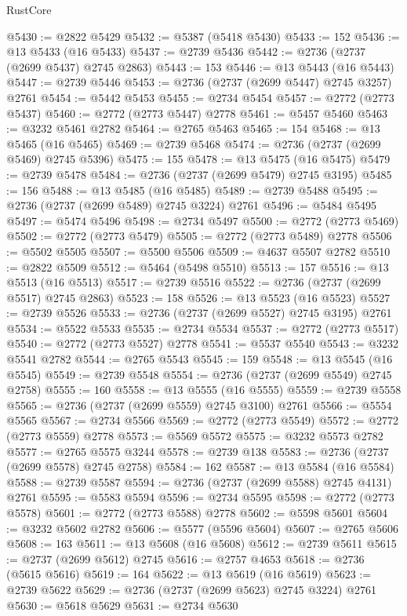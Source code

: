 \begin{lexlean}{RustCore}
\begin{coremodule}
@5430 := @2822 @5429
@5432 := @5387 (@5418 @5430)
@5433 := 152
@5436 := @13 @5433 (@16 @5433)
@5437 := @2739 @5436
@5442 := @2736 (@2737 (@2699 @5437) @2745 @2863)
@5443 := 153
@5446 := @13 @5443 (@16 @5443)
@5447 := @2739 @5446
@5453 := @2736 (@2737 (@2699 @5447) @2745 @3257) @2761
@5454 := @5442 @5453
@5455 := @2734 @5454
@5457 := @2772 (@2773 @5437)
@5460 := @2772 (@2773 @5447) @2778
@5461 := @5457 @5460
@5463 := @3232 @5461 @2782
@5464 := @2765 @5463
@5465 := 154
@5468 := @13 @5465 (@16 @5465)
@5469 := @2739 @5468
@5474 := @2736 (@2737 (@2699 @5469) @2745 @5396)
@5475 := 155
@5478 := @13 @5475 (@16 @5475)
@5479 := @2739 @5478
@5484 := @2736 (@2737 (@2699 @5479) @2745 @3195)
@5485 := 156
@5488 := @13 @5485 (@16 @5485)
@5489 := @2739 @5488
@5495 := @2736 (@2737 (@2699 @5489) @2745 @3224) @2761
@5496 := @5484 @5495
@5497 := @5474 @5496
@5498 := @2734 @5497
@5500 := @2772 (@2773 @5469)
@5502 := @2772 (@2773 @5479)
@5505 := @2772 (@2773 @5489) @2778
@5506 := @5502 @5505
@5507 := @5500 @5506
@5509 := @4637 @5507 @2782
@5510 := @2822 @5509
@5512 := @5464 (@5498 @5510)
@5513 := 157
@5516 := @13 @5513 (@16 @5513)
@5517 := @2739 @5516
@5522 := @2736 (@2737 (@2699 @5517) @2745 @2863)
@5523 := 158
@5526 := @13 @5523 (@16 @5523)
@5527 := @2739 @5526
@5533 := @2736 (@2737 (@2699 @5527) @2745 @3195) @2761
@5534 := @5522 @5533
@5535 := @2734 @5534
@5537 := @2772 (@2773 @5517)
@5540 := @2772 (@2773 @5527) @2778
@5541 := @5537 @5540
@5543 := @3232 @5541 @2782
@5544 := @2765 @5543
@5545 := 159
@5548 := @13 @5545 (@16 @5545)
@5549 := @2739 @5548
@5554 := @2736 (@2737 (@2699 @5549) @2745 @2758)
@5555 := 160
@5558 := @13 @5555 (@16 @5555)
@5559 := @2739 @5558
@5565 := @2736 (@2737 (@2699 @5559) @2745 @3100) @2761
@5566 := @5554 @5565
@5567 := @2734 @5566
@5569 := @2772 (@2773 @5549)
@5572 := @2772 (@2773 @5559) @2778
@5573 := @5569 @5572
@5575 := @3232 @5573 @2782
@5577 := @2765 @5575 @3244
@5578 := @2739 @138
@5583 := @2736 (@2737 (@2699 @5578) @2745 @2758)
@5584 := 162
@5587 := @13 @5584 (@16 @5584)
@5588 := @2739 @5587
@5594 := @2736 (@2737 (@2699 @5588) @2745 @4131) @2761
@5595 := @5583 @5594
@5596 := @2734 @5595
@5598 := @2772 (@2773 @5578)
@5601 := @2772 (@2773 @5588) @2778
@5602 := @5598 @5601
@5604 := @3232 @5602 @2782
@5606 := @5577 (@5596 @5604)
@5607 := @2765 @5606
@5608 := 163
@5611 := @13 @5608 (@16 @5608)
@5612 := @2739 @5611
@5615 := @2737 (@2699 @5612) @2745
@5616 := @2757 @4653
@5618 := @2736 (@5615 @5616)
@5619 := 164
@5622 := @13 @5619 (@16 @5619)
@5623 := @2739 @5622
@5629 := @2736 (@2737 (@2699 @5623) @2745 @3224) @2761
@5630 := @5618 @5629
@5631 := @2734 @5630

\end{coremodule}
\end{lexlean}

